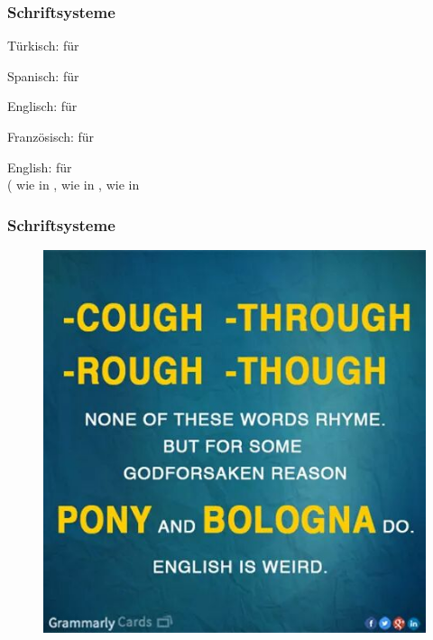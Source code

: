 \begin{frame}
\frametitle{Schriftsysteme}


	Türkisch:  für \textipa{[dYkkan]}
	
	Spanisch:  für \textipa{[negoTio]}
	
	Englisch:  für \textipa{[bIzn@z]}
	
	Französisch:  für \textipa{[butik]}
	
\pause	
	
	English:  für  \\
	( wie in ,  wie in ,  wie in 
	


\end{frame}



\begin{frame}
\frametitle{Schriftsysteme}


\begin{figure}
\centering
	\includegraphics[scale=.4]{material/04GraphEnglischPGK}
\end{figure}

\end{frame}


